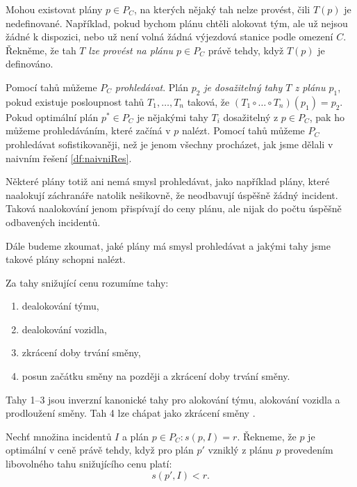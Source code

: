 Mohou existovat plány $p \in P_C$, na kterých nějaký tah nelze provést, čili $T(p)$ je nedefinované.
Například, pokud bychom plánu chtěli alokovat tým, ale už nejsou žádné k dispozici, nebo už není volná žádná výjezdová stanice podle omezení $C$.
Řekněme, že tah $T$ \textit{lze provést na plánu $p \in P_C$} právě tehdy, když $T(p)$ je definováno.

Pomocí tahů můžeme $P_C$ \textit{prohledávat}.
Plán $p_2$ \textit{je dosažitelný tahy $T$ z plánu $p_1$}, pokud existuje posloupnost tahů $T_1, \dots, T_n$ taková, že $(T_1 \circ \dots \circ T_n)(p_1) = p_2$.
Pokud optimální plán $p^* \in P_C$ je nějakými tahy $T_i$ dosažitelný z $p \in P_C$, pak ho můžeme prohledáváním, které začíná v $p$ nalézt.
Pomocí tahů můžeme $P_C$ prohledávat sofistikovaněji, než je jenom všechny procházet, jak jsme dělali v naivním řešení \ref{df:naivniRes}.

Některé plány totiž ani nemá smysl prohledávat, jako například plány, které naalokují záchranáře natolik nešikovně, že neodbavují úspěšně žádný incident.
Taková naalokování jenom přispívají do ceny plánu, ale nijak do počtu úspěšně odbavených incidentů.

Dále budeme zkoumat, jaké plány má smysl prohledávat a jakými tahy jsme takové plány schopni nalézt.
\begin{definice}\label{df:invKanTahy}
  Za tahy snižující cenu rozumíme tahy:
  \begin{enumerate}
    \item
      dealokování týmu,

    \item
      dealokování vozidla,

    \item
      zkrácení doby trvání směny,

    \item
      posun začátku směny na později a zkrácení doby trvání směny.

  \end{enumerate}
\end{definice}

Tahy 1--3 jsou inverzní kanonické tahy pro alokování týmu, alokování vozidla a prodloužení směny.
Tah 4 lze chápat jako zkrácení směny .

\begin{definice}\label{df:planOptVCene}
  Nechť množina incidentů $I$ a plán $p \in P_C \colon s(p, I) = r$.
  Řekneme, že $p$ je optimální v ceně právě tehdy, když
  pro plán $p'$ vzniklý z plánu $p$ provedením libovolného tahu snižujícího cenu platí: 
  \begin{equation*}
    s(p', I) < r.
  \end{equation*}
\end{definice}

